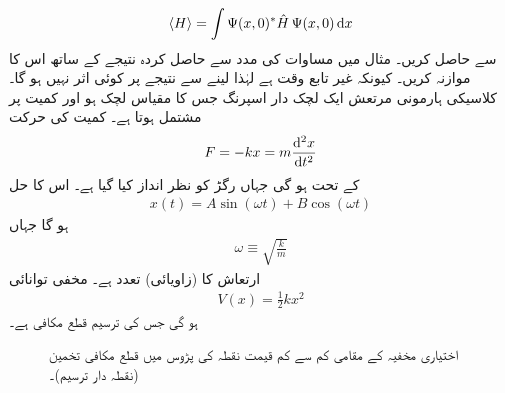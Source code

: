 \begin{align*}
\langle H \rangle=\int \Psi(x,0)^*\hat{H}\, \Psi(x,0)\dif x
\end{align*}
سے   حاصل کریں۔  مثال  میں مساوات  کی مدد سے حاصل کردہ نتیجے کے ساتھ اس کا  موازنہ کریں۔    کیونکہ  غیر تابع وقت ہے لہٰذا  لینے سے نتیجے پر کوئی اثر نہیں ہو گا۔ 
کلاسیکی ہارمونی مرتعش ایک لچک دار اسپرنگ جس کا مقیاس لچک  ہو اور کمیت  پر مشتمل ہوتا ہے۔ کمیت کی حرکت  
\begin{align*}
F=-kx=m\frac{\dif{^{2}x}}{\dif{t^{2}}}
\end{align*}
کے تحت ہو گی جہاں رگڑ کو نظر انداز کیا گیا ہے۔ اس کا حل
\begin{align*}
x(t)=A\sin(\omega t)+B\cos(\omega t)
\end{align*}
ہو گا جہاں
\begin{align}\label{مساوات_شروڈنگر_زاویائی_تعدد}
\omega\equiv \sqrt{\frac{k}{m}}
\end{align}
ارتعاش کا (زاویائی) تعدد ہے۔ مخفی توانائی
\begin{align}
V(x)=\frac{1}{2}kx^{2}
\end{align}
ہو گی جس کی ترسیم قطع مکافی ہے۔ 

\begin{figure}
\centering
{} 
\caption{اختیاری مخفیہ کے مقامی کم سے کم قیمت نقطہ کی پڑوس میں قطع مکافی تخمین (نقطہ دار ترسیم)۔}
\label{شکل_غیر_تابع_مقامی_کم_سے_کم_قطع_مکافی}
\end{figure}

